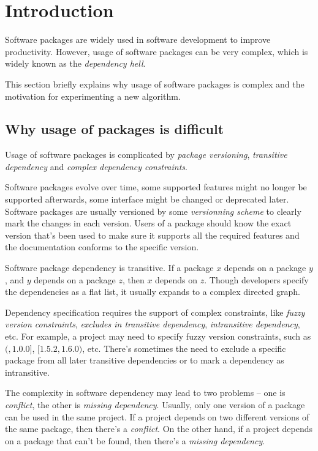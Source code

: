 \section{Introduction}

Software packages are widely used in software development to improve productivity. However, usage of software packages can be very complex, which is widely known as the \emph{dependency hell}.


This section briefly explains why usage of software packages is complex and the motivation for experimenting a new algorithm.

\subsection{Why usage of packages is difficult}
Usage of software packages is complicated by \emph{package versioning}, \emph{transitive dependency} and \emph{complex dependency constraints}.

Software packages evolve over time, some supported features might no longer be supported afterwards, some interface might be changed or deprecated later. Software packages are usually versioned by some \emph{versionning scheme} to clearly mark the changes in each version. Users of a package should know the exact version that's been used to make sure it supports all the required features and the documentation conforms to the specific version.

Software package dependency is transitive. If a package $x$ depends on a package $y$, and $y$ depends on a package $z$, then $x$ depends on $z$. Though developers specify the dependencies as a flat list, it usually expands to a complex directed graph.

Dependency specification requires the support of complex constraints, like \emph{fuzzy version constraints}, \emph{excludes in transitive dependency}, \emph{intransitive dependency}, etc. For example, a project may need to specify fuzzy version constraints, such as $(, 1.0.0]$, $[1.5.2, 1.6.0)$, etc. There's sometimes the need to exclude a specific package from all later transitive dependencies or to mark a dependency as intransitive.

The complexity in software dependency may lead to two problems -- one is \emph{conflict}, the other is \emph{missing dependency}. Usually, only one version of a package can be used in the same project. If a project depends on two different versions of the same package, then there's a \emph{conflict}. On the other hand, if a project depends on a package that can't be found, then there's a \emph{missing dependency}.

